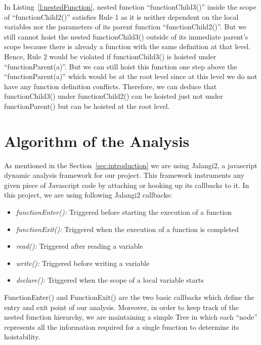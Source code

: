 \documentclass[authoryear,preprint]{sigplanconf}
\begin{document}
In Listing~\ref{l:nestedFunction}, nested function \enquote{functionChild3()} inside the scope of \enquote{functionChild2()} satisfies Rule 1 as it is neither dependent on the local variables nor the parameters of its parent function \enquote{functionChild2()}. But we still cannot hoist the nested functionChild3() outside of its immediate parent's scope because there is already a function with the same definition at that level. Hence, Rule 2 would be violated if functionChild3() is hoisted under \enquote{functionParent(a)}. But we can still hoist this function one step above the \enquote{functionParent(a)} which would be at the root level since at this level we do not have any function definition conflicts. Therefore, we can deduce that functionChild3() under functionChild2() can be hoisted just not under functionParent() but can be hoisted at the root level.

\section{Algorithm of the Analysis}
\label{sec:algorithm}
As mentioned in the Section~\ref{sec:introduction} we are using Jalangi2, a javascript dynamic analysis framework for our project. This framework instruments any given piece of Javascript code by attaching or hooking up its callbacks to it. In this project, we are using following Jalangi2 callbacks:

\begin{itemize}
 \item {\textit{functionEnter():}} Triggered before starting the execution of a function
 \item {\textit{functionExit():}} Triggered when the execution of a function is completed 
 \item {\textit{read():}} Triggered after reading a variable
 \item {\textit{write():}} Triggered before writing a variable
 \item {\textit{declare():}} Triggered when the scope of a local variable starts\\
\end{itemize}

FunctionEnter() and FunctionExit() are the two basic callbacks which define the entry and exit point of our analysis. Moreover, in order to keep track of the nested function hierarchy, we are maintaining a simple Tree in which each  \enquote{node} represents all the information required for a single function to determine its hoistability.
\end{document}
